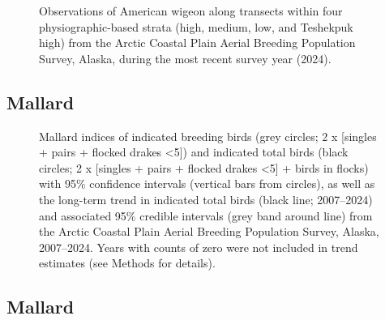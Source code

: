 \documentclass[
]{article}
\begin{document}
\begin{figure}


\caption{\label{fig-AMWImap}Observations of American wigeon along
transects within four physiographic-based strata (high, medium, low, and
Teshekpuk high) from the Arctic Coastal Plain Aerial Breeding Population
Survey, Alaska, during the most recent survey year (2024).}

\end{figure}%

\newpage{}

\subsection*{Mallard}\label{mallard}

\begin{figure}


\caption{\label{fig-MALL}Mallard indices of indicated breeding birds
(grey circles; 2 x {[}singles + pairs + flocked drakes \textless5{]})
and indicated total birds (black circles; 2 x {[}singles + pairs +
flocked drakes \textless5{]} + birds in flocks) with 95\% confidence
intervals (vertical bars from circles), as well as the long-term trend
in indicated total birds (black line; 2007--2024) and associated 95\%
credible intervals (grey band around line) from the Arctic Coastal Plain
Aerial Breeding Population Survey, Alaska, 2007--2024. Years with counts
of zero were not included in trend estimates (see Methods for details).}

\end{figure}%

\newpage{}

\subsection*{Mallard}\label{mallard-1}

\begingroup\fontsize{10}{12}\selectfont
\end{document}
